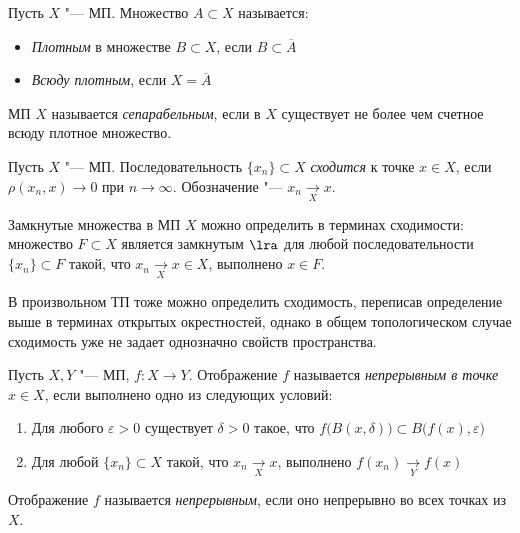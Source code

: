 \begin{definition}
	Пусть $X$ "--- МП. Множество $A \subset X$ называется:
	\begin{itemize}
		\item \textit{Плотным} в множестве $B \subset X$, если $B \subset \overline {A}$
 
		\item \textit{Всюду плотным}, если $X = \overline {A}$
	\end{itemize}
\end{definition}

\begin{definition}\label{separability}
	МП $X$ называется \textit{сепарабельным}, если в $X$ существует не более чем счетное всюду плотное множество.
\end{definition}

\begin{definition}
	Пусть $X$ "--- МП. Последовательность $\{x_n\} \subset X$ \textit{сходится} к точке $x \in X$, если $\rho(x_n, x) \to 0$ при $n \to \infty$. Обозначение "--- $x_n \xrightarrow[X]{} x$.
\end{definition}

\begin{note}
	Замкнутые множества в МП $X$ можно определить в терминах сходимости: множество $F \subset X$ является замкнутым $\lra$ для любой последовательности $\{x_n\} \subset F$ такой, что $x_n \xrightarrow[X]{} x \in X$, выполнено $x \in F$.
\end{note}

\begin{note}
	В произвольном ТП тоже можно определить сходимость, переписав определение выше в терминах открытых окрестностей, однако в общем топологическом случае сходимость уже не задает однозначно свойств пространства.
\end{note}

\begin{definition}
	Пусть $X, Y$ "--- МП, $f : X \to Y$. Отображение $f$ называется \textit{непрерывным в точке} $x \in X$, если выполнено одно из следующих условий:
	\begin{enumerate}
		\item Для любого $\varepsilon > 0$ существует $\delta > 0$ такое, что $f\big(B(x, \delta)\big) \subset B\big(f(x), \varepsilon\big)$
		
		\item Для любой $\{x_n\} \subset X$ такой, что $x_n \xrightarrow[X]{} x$, выполнено $f(x_n) \xrightarrow[Y]{} f(x)$
	\end{enumerate}

	Отображение $f$ называется \textit{непрерывным}, если оно непрерывно во всех точках из $X$.
\end{definition}

